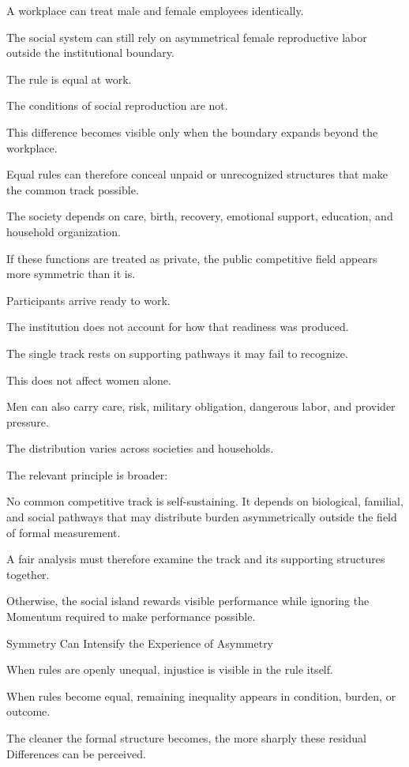 A workplace can treat male and female employees identically.

The social system can still rely on asymmetrical female reproductive labor outside the institutional boundary.

The rule is equal at work.

The conditions of social reproduction are not.

This difference becomes visible only when the boundary expands beyond the workplace.

Equal rules can therefore conceal unpaid or unrecognized structures that make the common track possible.

The society depends on care, birth, recovery, emotional support, education, and household organization.

If these functions are treated as private, the public competitive field appears more symmetric than it is.

Participants arrive ready to work.

The institution does not account for how that readiness was produced.

The single track rests on supporting pathways it may fail to recognize.

This does not affect women alone.

Men can also carry care, risk, military obligation, dangerous labor, and provider pressure.

The distribution varies across societies and households.

The relevant principle is broader:

No common competitive track is self-sustaining. It depends on biological, familial, and social pathways that may distribute burden asymmetrically outside the field of formal measurement.

A fair analysis must therefore examine the track and its supporting structures together.

Otherwise, the social island rewards visible performance while ignoring the Momentum required to make performance possible.

Symmetry Can Intensify the Experience of Asymmetry

When rules are openly unequal, injustice is visible in the rule itself.

When rules become equal, remaining inequality appears in condition, burden, or outcome.

The cleaner the formal structure becomes, the more sharply these residual Differences can be perceived.

